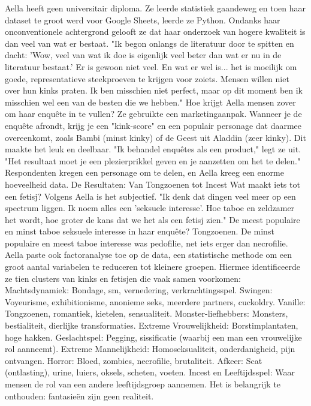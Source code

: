 Aella heeft geen universitair diploma. Ze leerde statistiek gaandeweg en toen haar dataset te groot werd voor Google Sheets, leerde ze Python. Ondanks haar onconventionele achtergrond gelooft ze dat haar onderzoek van hogere kwaliteit is dan veel van wat er bestaat. "Ik begon onlangs de literatuur door te spitten en dacht: 'Wow, veel van wat ik doe is eigenlijk veel beter dan wat er nu in de literatuur bestaat.' Er is gewoon niet veel. En wat er wel is... het is moeilijk om goede, representatieve steekproeven te krijgen voor zoiets. Mensen willen niet over hun kinks praten. Ik ben misschien niet perfect, maar op dit moment ben ik misschien wel een van de besten die we hebben."
Hoe krijgt Aella mensen zover om haar enquête in te vullen? Ze gebruikte een marketingaanpak. Wanneer je de enquête afrondt, krijg je een "kink-score" en een populair personage dat daarmee overeenkomt, zoals Bambi (minst kinky) of de Geest uit Aladdin (zeer kinky). Dit maakte het leuk en deelbaar. "Ik behandel enquêtes als een product," legt ze uit. "Het resultaat moet je een plezierprikkel geven en je aanzetten om het te delen." Respondenten kregen een personage om te delen, en Aella kreeg een enorme hoeveelheid data.
De Resultaten: Van Tongzoenen tot Incest
Wat maakt iets tot een fetisj? Volgens Aella is het subjectief. "Ik denk dat dingen veel meer op een spectrum liggen. Ik noem alles een 'seksuele interesse'. Hoe taboe en zeldzamer het wordt, hoe groter de kans dat we het als een fetisj zien." De meest populaire en minst taboe seksuele interesse in haar enquête? Tongzoenen. De minst populaire en meest taboe interesse was pedofilie, net iets erger dan necrofilie.
Aella paste ook factoranalyse toe op de data, een statistische methode om een groot aantal variabelen te reduceren tot kleinere groepen. Hiermee identificeerde ze tien clusters van kinks en fetisjen die vaak samen voorkomen:
Machtsdynamiek: Bondage, sm, vernedering, verkrachtingsspel.
Swingen: Voyeurisme, exhibitionisme, anonieme seks, meerdere partners, cuckoldry.
Vanille: Tongzoenen, romantiek, kietelen, sensualiteit.
Monster-liefhebbers: Monsters, bestialiteit, dierlijke transformaties.
Extreme Vrouwelijkheid: Borstimplantaten, hoge hakken.
Geslachtspel: Pegging, sissificatie (waarbij een man een vrouwelijke rol aanneemt).
Extreme Mannelijkheid: Homoseksualiteit, onderdanigheid, pijn ontvangen.
Horror: Bloed, zombies, necrofilie, brutaliteit.
Afkeer: Scat (ontlasting), urine, luiers, oksels, scheten, voeten.
Incest en Leeftijdsspel: Waar mensen de rol van een andere leeftijdsgroep aannemen.
Het is belangrijk te onthouden: fantasieën zijn geen realiteit.
